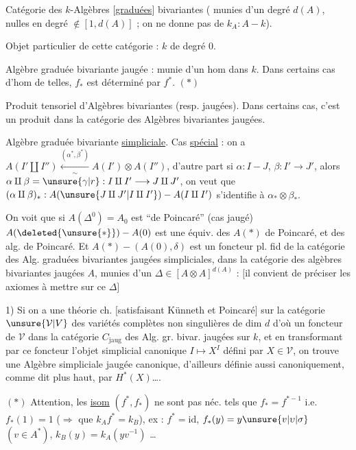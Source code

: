 Catégorie des $k$-Algèbres $[$\uline{graduées}$]$
 bivariantes ( munies d'un degré $d(A)$, nulles en degré $\notin[1,d(A)]$ ; on ne donne pas de $k_A:A-k$).

Objet particulier de cette catégorie : $k$ de degré 0.

Algèbre graduée bivariante jaugée : munie d'un hom dans $k$. Dans certains cas d'hom de telles, $f_*$ est déterminé par $f^*$. $(*)$

Produit tensoriel d'Algèbres bivariantes (resp. jaugées). Dans certains cas, c'est un produit dans la catégorie des Algèbres bivariantes jaugées.

Algèbre graduée bivariante  \uline{simpliciale}.  Cas \uline{spécial} : on a $A(I'\amalg I'')\xleftarrow[\sim]{(\alpha^*,\beta^*)}A(I')\otimes A(I'')$, d'autre part si $\alpha:I-J$, $\beta:I'\to J'$, alors $\alpha\amalg\beta=\unsure{\gamma|r}:I\amalg I'\longrightarrow J\amalg J'$, on veut que $(\alpha\amalg\beta)_*:A(\unsure{J\amalg J'|I\amalg I'})-A(I\amalg I')$ s'identifie à $\alpha_*\otimes\beta_*$.

On voit que si $A(\Delta^0)=A_0$ est ``de Poincaré'' (cas jaugé) $A(\deleted{\unsure{*}})-A(0)$ est une équiv. des $A(*)$  de Poincaré, et des alg. de Poincaré. Et $A(*)-(A(0),\delta)$ est un foncteur pl. fid de la catégorie des Alg. graduées bivariantes jaugées simpliciales, dans la catégorie des algèbres  bivariantes jaugées $A$, munies d'un $\Delta\in[A\otimes A]^{d(A)}$ : $[$il convient de préciser les axiomes à mettre sur ce $\Delta]$

 1) Si on a une théorie ch.  $[$satisfaisant Künneth et Poincaré$]$ sur la catégorie $\unsure{\mathcal V|V}$ des variétés complètes  non singulières de dim $d$ d'où un foncteur  de $\mathcal V$ dans la catégorie $C_{\mathrm{jaug}}$ des Alg. gr. bivar. jaugées sur $k$, et en transformant par ce foncteur l'objet simplicial canonique $I\longmapsto X^I$ défini par $X\in\mathcal V$, on trouve une Algèbre  simpliciale  jaugée canonique, d'ailleurs définie aussi canoniquement, comme dit plus haut, par   $H^*(X)$\ldots.

$(*)$ Attention, les \uline{isom} $(f^*,f_*)$ ne sont pas néc. tels que $f_*=f^{*-1}$ i.e. $f_*(1)=1$ ($\Rightarrow$  que $k_A f^*=k_B$), ex : $f^*=\mathrm{id}$, $f_*(y)=y\unsure{v|\upsilon|\sigma}$ $(v\in A^*)$, $k_B(y)=k_A(yv^{-1})$ \ldots

